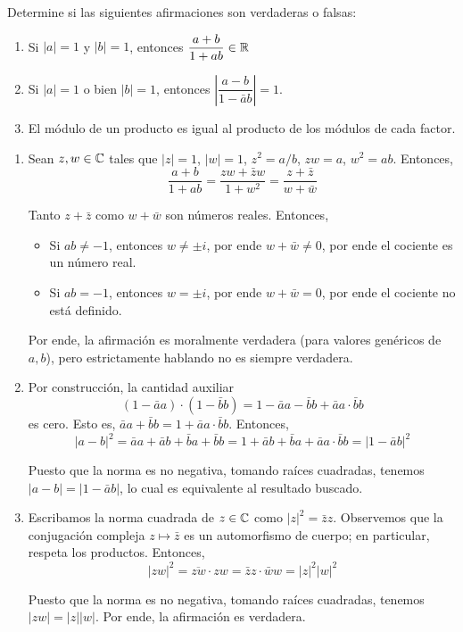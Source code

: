 \begin{exercise}
Determine si las siguientes afirmaciones son verdaderas o falsas:
\begin{enumerate}[label=(\alph*)]
    \item Si $|a| = 1$ y $|b| = 1$, entonces $\dfrac {a + b} {1 + ab} \in \mathbb R$
    \item Si $|a| = 1$ o bien $|b| = 1$, entonces $\left| \dfrac {a - b} {1 - \bar ab} \right| = 1$.
    \item El módulo de un producto es igual al producto de los módulos de cada factor.
\end{enumerate}
\end{exercise}

\begin{solution}
\leavevmode
\begin{enumerate}[label=(\alph*)]
    \item Sean $z, w \in \mathbb C$ tales que $|z| = 1$, $|w| = 1$, $z^2 = a/b$, $zw = a$, $w^2 = ab$. Entonces,
    $$\frac {a + b} {1 + ab} = \frac {zw + \bar zw} {1 + w^2} = \frac {z + \bar z} {w + \bar w}$$
    
    Tanto $z + \bar z$ como $w + \bar w$ son números reales. Entonces,
    \begin{itemize}
        \item Si $ab \ne -1$, entonces $w \ne \pm i$, por ende $w + \bar w \ne 0$, por ende el cociente es un número real.
        \item Si $ab = -1$, entonces $w = \pm i$, por ende $w + \bar w = 0$, por ende el cociente no está definido.
    \end{itemize}
    
    Por ende, la afirmación es moralmente verdadera (para valores genéricos de $a, b$), pero estrictamente hablando no es siempre verdadera.
    
    \item Por construcción, la cantidad auxiliar
    $$(1 - \bar aa) \cdot (1 - \bar bb) = 1 - \bar aa - \bar bb + \bar aa \cdot \bar bb$$
    es cero. Esto es, $\bar aa + \bar bb = 1 + \bar aa \cdot \bar bb$. Entonces,
    $$|a - b|^2 = \bar aa + \bar ab + \bar ba + \bar bb = 1 + \bar ab + \bar ba + \bar aa \cdot \bar bb = |1 - \bar ab|^2$$
    
    Puesto que la norma es no negativa, tomando raíces cuadradas, tenemos $|a - b| = |1 - \bar ab|$, lo cual es equivalente al resultado buscado.
    
    \item Escribamos la norma cuadrada de $z \in \mathbb C$ como $|z|^2 = \bar zz$. Observemos que la conjugación compleja $z \mapsto \bar z$ es un automorfismo de cuerpo; en particular, respeta los productos. Entonces,
    $$|zw|^2 = \overline {zw} \cdot zw = \bar zz \cdot \bar ww = |z|^2 |w|^2$$
    
    Puesto que la norma es no negativa, tomando raíces cuadradas, tenemos $|zw| = |z| |w|$. Por ende, la afirmación es verdadera.
\end{enumerate}
\end{solution}
